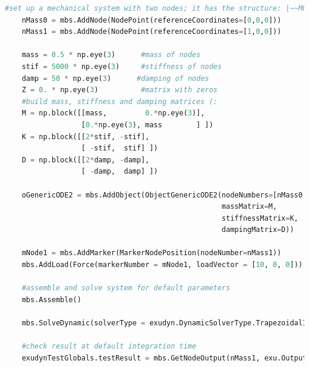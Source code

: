 \label{miniExample_ObjectGenericODE2}
\pythonstyle
\begin{lstlisting}[language=Python, firstnumber=1]
    #set up a mechanical system with two nodes; it has the structure: |~~M0~~M1
    nMass0 = mbs.AddNode(NodePoint(referenceCoordinates=[0,0,0]))
    nMass1 = mbs.AddNode(NodePoint(referenceCoordinates=[1,0,0]))

    mass = 0.5 * np.eye(3)      #mass of nodes
    stif = 5000 * np.eye(3)     #stiffness of nodes
    damp = 50 * np.eye(3)      #damping of nodes
    Z = 0. * np.eye(3)          #matrix with zeros
    #build mass, stiffness and damping matrices (:
    M = np.block([[mass,         0.*np.eye(3)],
                  [0.*np.eye(3), mass        ] ])
    K = np.block([[2*stif, -stif],
                  [ -stif,  stif] ])
    D = np.block([[2*damp, -damp],
                  [ -damp,  damp] ])
    
    oGenericODE2 = mbs.AddObject(ObjectGenericODE2(nodeNumbers=[nMass0,nMass1], 
                                                   massMatrix=M, 
                                                   stiffnessMatrix=K,
                                                   dampingMatrix=D))
    
    mNode1 = mbs.AddMarker(MarkerNodePosition(nodeNumber=nMass1))
    mbs.AddLoad(Force(markerNumber = mNode1, loadVector = [10, 0, 0])) #static solution=10*(1/5000+1/5000)=0.0004

    #assemble and solve system for default parameters
    mbs.Assemble()
    
    mbs.SolveDynamic(solverType = exudyn.DynamicSolverType.TrapezoidalIndex2)

    #check result at default integration time
    exudynTestGlobals.testResult = mbs.GetNodeOutput(nMass1, exu.OutputVariableType.Position)[0]
\end{lstlisting}


